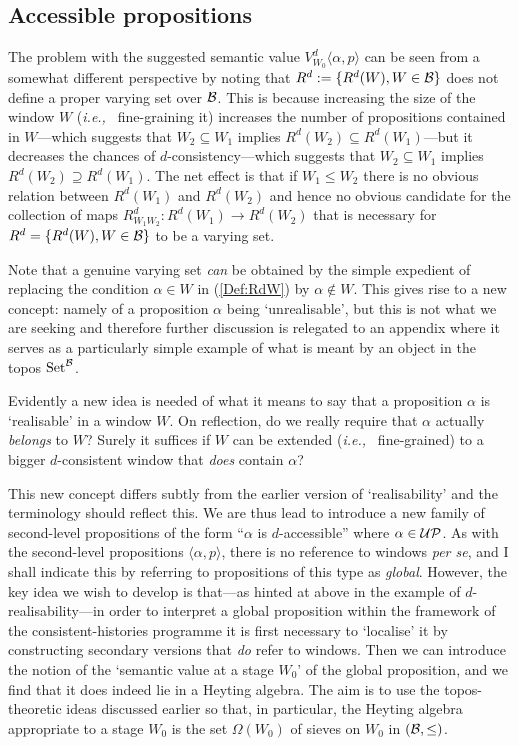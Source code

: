 \documentclass[12pt]{article}
\newcounter{def-number}[section]
\newcommand{\eq}[1]{(\ref{#1})}
\newcommand{\ie}{{\em i.e.,\ }}
\renewcommand{\a}{\alpha}                   %
\newcommand{\gp}[2]{\langle#1,#2\rangle}
\newcommand{\map}{\rightarrow}
\newcommand{\B}{{\cal B}}
\newcommand{\Om}{\Omega}
\newcommand{\UP}{{\cal UP}}
\newcommand{\Set}{{\rm Set}}
\newcommand{\SetB}{{\Set^{\cal B}}}
\begin{document}
\subsection{Accessible propositions}
The problem with the suggested semantic value $V^d_{W_0}\gp{\a}p$
can be seen from a somewhat different perspective by noting that
$R^d:=\{R^d(W),W\in\B\}$ does not define a proper varying set over
$\B$. This is because increasing the size of the window $W$ (\ie
fine-graining it) increases the number of propositions contained in
$W$---which suggests that $W_2\subseteq W_1$ implies
$R^d(W_2)\subseteq R^d(W_1)$---but it decreases the chances of
$d$-consistency---which suggests that $W_2\subseteq W_1$ implies
$R^d(W_2)\supseteq R^d(W_1)$. The net effect is that if $W_1\leq
W_2$ there is no obvious relation between $R^d(W_1)$ and $R^d(W_2)$
and hence no obvious candidate for the collection of maps
$R^d_{W_1W_2}:R^d(W_1)\map R^d(W_2)$ that is necessary for
$R^d=\{R^d(W),W\in\B\}$ to be a varying set.

	Note that a genuine varying set {\em can\/} be obtained by
the simple expedient of replacing the condition $\a\in W$ in
\eq{Def:RdW} by $\a\not\in W$. This gives rise to a new concept:
namely of a proposition $\a$ being `unrealisable', but this is not
what we are seeking and therefore further discussion is relegated to
an appendix where it serves as a particularly simple example of what
is meant by an object in the topos $\SetB$.

	Evidently a new idea is needed of what it means to say
that a proposition $\a$ is `realisable' in a window $W$.  On
reflection, do we really require that $\a$ actually {\em
belongs\/} to $W$? Surely it suffices if $W$ can be extended (\ie
fine-grained) to a bigger $d$-consistent window that {\em does\/}
contain $\a$?

	This new concept differs subtly from the earlier version of
`realisability' and the terminology should reflect this.  We are
thus lead to introduce a new family of second-level propositions
of the form ``$\a$ is $d$-accessible'' where $\a\in\UP$. As with
the second-level propositions $\gp{\a}{p}$, there is no reference
to windows {\em per se\/}, and I shall indicate this by referring
to propositions of this type as {\em global}.  However, the key
idea we wish to develop is that---as hinted at above in the
example of $d$-realisability---in order to interpret a global
proposition within the framework of the consistent-histories
programme it is first necessary to `localise' it by constructing
secondary versions that {\em do\/} refer to windows.  Then we can
introduce the notion of the `semantic value at a stage $W_0$' of
the global proposition, and we find that it does indeed lie in a
Heyting algebra. The aim is to use the topos-theoretic ideas
discussed earlier so that, in particular, the Heyting algebra
appropriate to a stage $W_0$ is the set $\Om(W_0)$ of sieves on
$W_0$ in $(\B,\leq)$.  
\end{document}
